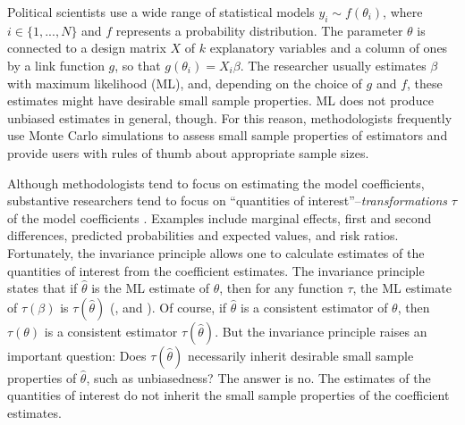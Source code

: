 \documentclass[12pt]{article}
\begin{document}
Political scientists use a wide range of statistical models $y_i \sim f(\theta_i)$, where $i \in \{1,..., N\}$ and $f$ represents a probability distribution. 
The parameter $\theta$ is connected to a design matrix $X$ of $k$ explanatory variables and a column of ones by a link function $g$, so that $g(\theta_i) = X_i\beta$. 
The researcher usually estimates $\beta$ with maximum likelihood (ML), and, depending on the choice of $g$ and $f$, these estimates might have desirable small sample properties. 
ML does not produce unbiased estimates in general, though. 
For this reason, methodologists frequently use Monte Carlo simulations to assess small sample properties of estimators and provide users with rules of thumb about appropriate sample sizes.

Although methodologists tend to focus on estimating the model coefficients, substantive researchers tend to focus on ``quantities of interest''--\textit{transformations} $\tau$ of the model coefficients \citep{KingTomzWittenberg2000}. 
Examples include marginal effects, first and second differences, predicted probabilities and expected values, and risk ratios. 
Fortunately, the invariance principle allows one to calculate estimates of the quantities of interest from the coefficient estimates.
The invariance principle states that if $\hat{\theta}$ is the ML estimate of $\theta$, then for any function $\tau$, the ML estimate of $\tau(\beta)$ is $\tau(\hat{\theta})$ (\citealt[pp. 75-76]{King1989}, and \citealt[pp. 320-321]{CasellaBerger2002}). %
Of course, if $\hat{\theta}$ is a consistent estimator of $\theta$, then $\tau(\theta)$ is a consistent estimator $\tau(\hat{\theta})$. But the invariance principle raises an important question: Does $\tau(\hat{\theta})$ necessarily inherit desirable small sample properties of $\hat{\theta}$, such as unbiasedness? 
The answer is no. 
The estimates of the quantities of interest do not inherit the small sample properties of the coefficient estimates. 
\end{document}
